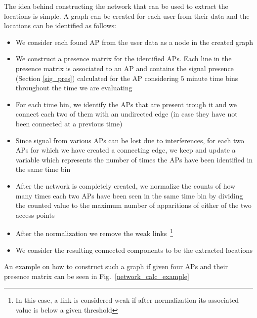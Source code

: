 The idea behind constructing the network  that can be used to extract the
locations is simple. A graph can be created for each user from their data and
the locations can be identified as follows:
\begin{itemize}
  \item We consider each found AP from the user data as a node in the created
  graph
  \item We construct a presence matrix for the identified APs. Each line in the
  presence matrix is associated to an AP and contains the signal presence
  (Section \ref{sig_pres}) calculated for the AP considering $5$ minute time bins
  throughout the time we are evaluating
  \item For each time bin, we identify the APs that are present trough it and
  we connect each two of them with an undirected edge (in case they have not
  been connected at a previous time)
  \item Since signal from various APs can be lost due to interferences, for each
  two APs for which we have created a connecting edge, we keep and update a
  variable which represents the number of times the APs have been identified in
  the same time bin
  \item After the network is completely created, we normalize the counts of how
  many times each two APs have been seen in the same time bin by dividing the
  counted value to the maximum number of apparitions of either of the two access points
  \item After the normalization we remove the weak links~\footnote{In this
  case, a link is considered weak if after normalization its associated value is
  below a given threshold}
  \item We consider the resulting connected components to be the extracted
  locations
\end{itemize}

An example on how to construct such a graph if given four APs and their
presence matrix can be seen in Fig.~\ref{network_calc_example}

